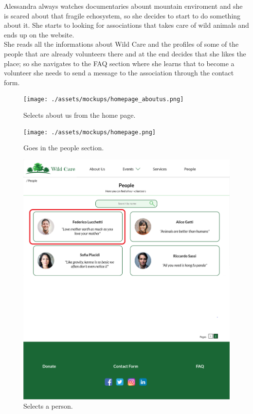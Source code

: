 Alessandra always watches documentaries abount mountain enviroment and she is scared about that fragile echosystem, so she decides to start to do something about it. She starts to looking for associations that takes care of wild animals and ends up on the website. \\
She reads all the informations about Wild Care and the profiles of some of the people that are already volunteers there and at the end decides that she likes the place; so she navigates to the FAQ section where she learns that to become a volunteer she needs to send a message to the association through the contact form.

	\begin{figure}[h!]
		\centering
		\begin{minipage}[b]{1\textwidth}
    			\texttt{[image: ./assets/mockups/homepage\_aboutus.png]}
			\caption{Selects about us from the home page.}
		\end{minipage}
	\end{figure}

	\begin{figure}[h!]
		\centering
		\begin{minipage}[b]{1\textwidth}
    			\texttt{[image: ./assets/mockups/homepage.png]}
			\caption{Goes in the people section.}
		\end{minipage}
	\end{figure}

	\begin{figure}[h!]
		\centering
		\begin{minipage}[b]{1\textwidth}
    			\includegraphics[width=\textwidth]{./assets/mockups/people_persondetails.png}
			\caption{Selects a person.}
		\end{minipage}
	\end{figure}

